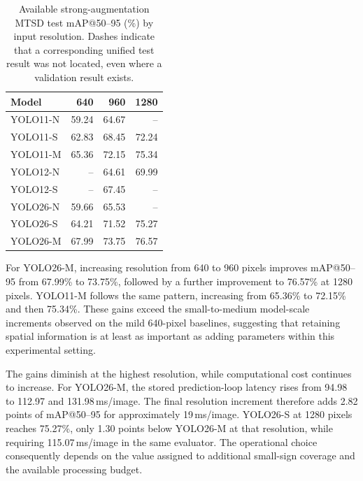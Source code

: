 \begin{table}[htbp]
\centering
\small
\caption{Available strong-augmentation \gls{MTSD} test \gls{mAP}@50--95 (\%) by input resolution. Dashes indicate that a corresponding unified test result was not located, even where a validation result exists.}
\label{tab:ev-resolution}
\renewcommand{\arraystretch}{1.15}
\begin{tabularx}{\textwidth}{@{}>{\raggedright\arraybackslash}Xrrr@{}}
\toprule
Model & 640 & 960 & 1280 \\
\midrule
YOLO11-N & 59.24 & 64.67 & -- \\
YOLO11-S & 62.83 & 68.45 & 72.24 \\
YOLO11-M & 65.36 & 72.15 & 75.34 \\
YOLO12-N & -- & 64.61 & 69.99 \\
YOLO12-S & -- & 67.45 & -- \\
YOLO26-N & 59.66 & 65.53 & -- \\
YOLO26-S & 64.21 & 71.52 & 75.27 \\
YOLO26-M & 67.99 & 73.75 & 76.57 \\
\bottomrule
\end{tabularx}
\end{table}


For YOLO26-M, increasing resolution from 640 to 960 pixels improves \gls{mAP}@50--95 from 67.99\% to 73.75\%, followed by a further improvement to 76.57\% at 1280 pixels. YOLO11-M follows the same pattern, increasing from 65.36\% to 72.15\% and then 75.34\%. These gains exceed the small-to-medium model-scale increments observed on the mild 640-pixel baselines, suggesting that retaining spatial information is at least as important as adding parameters within this experimental setting.

The gains diminish at the highest resolution, while computational cost continues to increase. For YOLO26-M, the stored prediction-loop latency rises from 94.98 to 112.97 and 131.98\,ms/image. The final resolution increment therefore adds 2.82 points of \gls{mAP}@50--95 for approximately 19\,ms/image. YOLO26-S at 1280 pixels reaches 75.27\%, only 1.30 points below YOLO26-M at that resolution, while requiring 115.07\,ms/image in the same evaluator. The operational choice consequently depends on the value assigned to additional small-sign coverage and the available processing budget.

